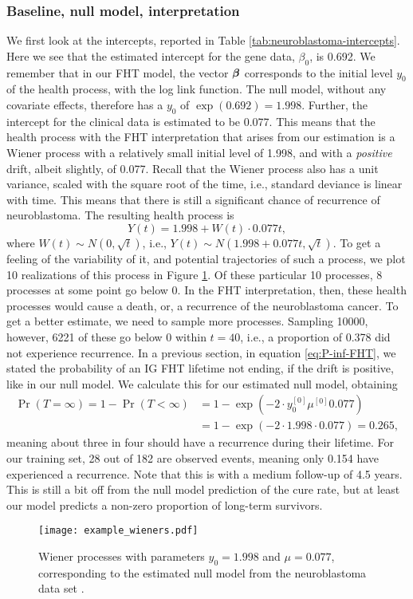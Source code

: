 \subsubsection{Baseline, null model, interpretation}
We first look at the intercepts, reported in Table \ref{tab:neuroblastoma-intercepts}.
Here we see that the estimated intercept for the gene data, $\beta_0$, is 0.692.
We remember that in our FHT model, the vector $\boldsymbol{\beta}$ corresponds to the initial level $y_0$ of the health process, with the log link function.
The null model, without any covariate effects, therefore has a $y_0$ of $\exp(0.692)=1.998$.
Further, the intercept for the clinical data is estimated to be 0.077.
This means that the health process with the FHT interpretation that arises from our estimation is a Wiener process with a relatively small initial level of 1.998, and with a \textit{positive} drift, albeit slightly, of 0.077.
Recall that the Wiener process also has a unit variance, scaled with the square root of the time, i.e., standard deviance is linear with time.
This means that there is still a significant chance of recurrence of neuroblastoma.
The resulting health process is
\begin{equation}
    Y(t)=1.998+W(t)\cdot0.077t,
\end{equation}
where $W(t)\sim N(0,\sqrt{t})$,
i.e.,
$Y(t)\sim N(1.998+0.077t,\sqrt{t})$.
To get a feeling of the variability of it, and potential trajectories of such a process, we plot 10 realizations of this process in Figure \ref{fig:neuroblastoma-wien}.
Of these particular 10 processes, 8 processes at some point go below 0.
In the FHT interpretation, then, these health processes would cause a death, or, a recurrence of the neuroblastoma cancer.
To get a better estimate, we need to sample more processes.
Sampling 10000, however, 6221 of these go below 0 within $t=40$, i.e., a proportion of 0.378 did not experience recurrence.
In a previous section, in equation \eqref{eq:P-inf-FHT}, we stated the probability of an IG FHT lifetime not ending, if the drift is positive, like in our null model.
We calculate this for our estimated null model, obtaining
\begin{align*}
    \Pr{(T=\infty)}=1-\Pr{(T<\infty)}&=1-\exp{(-2\cdot y_0^{[0]}\mu^{[0]} 0.077)}\\
    &=1-\exp{(-2\cdot 1.998\cdot 0.077)}=0.265,
\end{align*}
meaning about three in four should have a recurrence during their lifetime.
For our training set, 28 out of 182 are observed events, meaning only 0.154 have experienced a recurrence.
Note that this is with a medium follow-up of 4.5 years.
This is still a bit off from the null model prediction of the cure rate, but at least our model predicts a non-zero proportion of long-term survivors.
\begin{figure}
\caption{Wiener processes with parameters $y_0=1.998$ and $\mu=0.077$, corresponding to the estimated null model from the neuroblastoma data set \citep{oberthuer-data}.}
\label{fig:neuroblastoma-wien}
\centering
\texttt{[image: example\_wieners.pdf]}
\end{figure}




